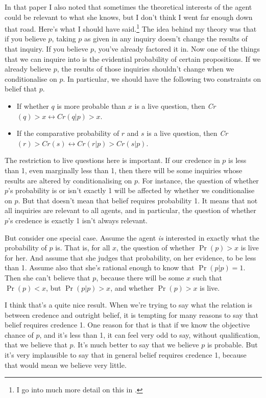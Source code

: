 In that paper I also noted that sometimes the theoretical interests of the agent could be relevant to what she knows, but I don't think I went far enough down that road. Here's what I should have said.\footnote{I go into much more detail on this in \citet{Weatherson2011-WEAKBI}.} The idea behind my theory was that if you believe $p$, taking $p$ as given in any inquiry doesn't change the results of that inquiry. If you believe $p$, you've already factored it in. Now one of the things that we can inquire into is the evidential probability of certain propositions. If we already believe $p$, the results of those inquiries shouldn't change when we conditionalise on $p$. In particular, we should have the following two constraints on belief that $p$.

\begin{itemize}
\item If whether $q$ is more probable than $x$ is a live question, then \textit{Cr}$(q) > x \leftrightarrow \textit{Cr}(q | p) > x$.
\item If the comparative probability of $r$ and $s$ is a live question, then \textit{Cr}$(r) > \textit{Cr}(s) \leftrightarrow \textit{Cr}(r | p) > \textit{Cr}(s | p)$.
\end{itemize}

\noindent The restriction to live questions here is important. If our credence in $p$ is less than 1, even marginally less than 1, then there will be some inquiries whose results are altered by conditionalising on $p$. For instance, the question of whether $p$'s probability is or isn't exactly 1 will be affected by whether we conditionalise on $p$. But that doesn't mean that belief requires probability 1. It means that not all inquiries are relevant to all agents, and in particular, the question of whether $p$'s credence is exactly 1 isn't always relevant.

But consider one special case. Assume the agent \textit{is} interested in exactly what the probability of $p$ is. That is, for all $x$, the question of whether $\Pr(p) > x$ is live for her. And assume that she judges that probability, on her evidence, to be less than 1. Assume also that she's rational enough to know that $\Pr(p | p) = 1$. Then she can't believe that $p$, because there will be some $x$ such that $\Pr(p) < x$, but $\Pr(p | p) > x$, and whether $\Pr(p) > x$ is live.

I think that's a quite nice result. When we're trying to say what the relation is between credence and outright belief, it is tempting for many reasons to say that belief requires credence 1. One reason for that is that if we know the objective chance of $p$, and it's less than 1, it can feel very odd to say, without qualification, that we believe that $p$. It's much better to say that we believe $p$ is probable. But it's very implausible to say that in general belief requires credence 1, because that would mean we believe very little.

